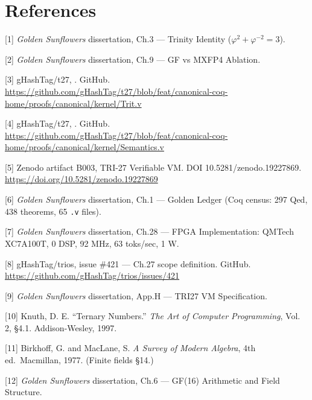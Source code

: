 \section{References}\label{fa_27:references}

[1] \emph{Golden Sunflowers} dissertation,
Ch.3 --- Trinity Identity
(\(\varphi^2 + \varphi^{-2} = 3\)).

[2] \emph{Golden Sunflowers} dissertation,
Ch.9 --- GF vs MXFP4 Ablation.

[3] gHashTag/t27,
. GitHub.
\url{https://github.com/gHashTag/t27/blob/feat/canonical-coq-home/proofs/canonical/kernel/Trit.v}

[4] gHashTag/t27,
.
GitHub.
\url{https://github.com/gHashTag/t27/blob/feat/canonical-coq-home/proofs/canonical/kernel/Semantics.v}

[5] Zenodo artifact B003, TRI-27 Verifiable
VM. DOI 10.5281/zenodo.19227869.
\url{https://doi.org/10.5281/zenodo.19227869}

[6] \emph{Golden Sunflowers} dissertation,
Ch.1 --- Golden Ledger (Coq census: 297 Qed, 438
theorems, 65 \texttt{.v} files).

[7] \emph{Golden Sunflowers} dissertation,
Ch.28 --- FPGA Implementation: QMTech XC7A100T, 0
DSP, 92 MHz, 63 toks/sec, 1 W.

[8] gHashTag/trios, issue \#421 --- Ch.27
scope definition. GitHub.
\url{https://github.com/gHashTag/trios/issues/421}

[9] \emph{Golden Sunflowers} dissertation,
App.H --- TRI27 VM Specification.

[10] Knuth, D. E. ``Ternary Numbers.''
\emph{The Art of Computer Programming}, Vol. 2,
§4.1. Addison-Wesley, 1997.

[11] Birkhoff, G. and MacLane, S. \emph{A
Survey of Modern Algebra}, 4th ed.~Macmillan,
1977. (Finite fields §14.)

[12] \emph{Golden Sunflowers} dissertation,
Ch.6 --- GF(16) Arithmetic and Field Structure.


